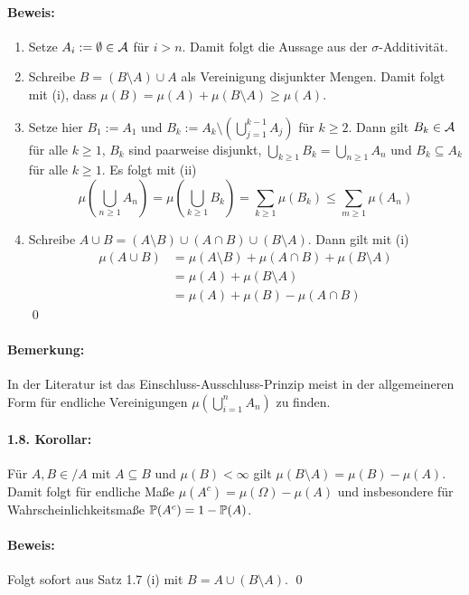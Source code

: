 \paragraph{Beweis:}
\begin{enumerate}[label=(\roman*)]
    \item Setze $A_i:=\emptyset\in\mathcal{A}$ f\"ur $i>n$. Damit folgt die Aussage aus der $\sigma$-Additivit\"at.
    \item Schreibe $B=(B\setminus A)\cup A$ als Vereinigung disjunkter Mengen. Damit folgt mit (i), dass $\mu(B)=\mu(A)+\mu(B\setminus A)\geq\mu(A)$.
    \item Setze hier $B_1:=A_1$ und $B_k:=A_k\setminus\left(\bigcup_{j=1}^{k-1}A_j\right)$ f\"ur $k\geq2$. Dann gilt $B_k\in\mathcal{A}$ f\"ur alle $k\geq1$, $B_k$ sind paarweise disjunkt, $\bigcup_{k\geq1}B_k=\bigcup_{n\geq1}A_n$ und $B_k\subseteq A_k$ f\"ur alle $k\geq1$. Es folgt mit (ii)
    $$\mu\left(\bigcup_{n\geq1}A_n\right)=\mu\left(\bigcup_{k\geq1}B_k\right)=\sum_{k\geq1}\mu(B_k)\leq\sum_{m\geq1}\mu(A_n)$$
    \item Schreibe $A\cup B=(A\setminus B)\cup(A\cap B)\cup(B\setminus A)$. Dann gilt mit (i)
    \begin{align*}
        \mu(A\cup B)&=\mu(A\setminus B)+\mu(A\cap B)+\mu(B\setminus A)\\
        &=\mu(A)+\mu(B\setminus A)\\
        &=\mu(A)+\mu(B)-\mu(A\cap B)
    \end{align*}
    \qed
\end{enumerate}

\paragraph{Bemerkung:}In der Literatur ist das Einschluss-Ausschluss-Prinzip meist in der allgemeineren Form f\"ur endliche Vereinigungen $\mu\left(\bigcup_{i=1}^nA_n\right)$ zu finden.

\paragraph{1.8. Korollar:}F\"ur $A,B\in/A$ mit $A\subseteq B$ und $\mu(B)<\infty$ gilt $\mu(B\setminus A)=\mu(B)-\mu(A)$. Damit folgt f\"ur endliche Ma\ss{}e $\mu(A^c)=\mu(\Omega)-\mu(A)$ und insbesondere f\"ur Wahrscheinlichkeitsma\ss{}e $\mathbb{P}(A^c)=1-\mathbb{P}(A)$.

\paragraph{Beweis:}Folgt sofort aus Satz 1.7 (i) mit $B=A\cup (B\setminus A)$. \qed

